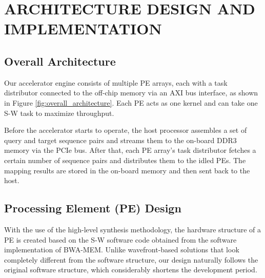 \section{ARCHITECTURE DESIGN AND IMPLEMENTATION} 
\label{sec:architecture}
\subsection{Overall Architecture}

Our accelerator engine consists of multiple PE arrays, each with a task distributor connected to the off-chip memory via an AXI bus interface, as shown in Figure \ref{fig:overall_architecture}.
Each PE acts as one kernel and can take one S-W task to maximize throughput.

Before the accelerator starts to operate, the host processor assembles a set of query and target sequence pairs and streams them to the on-board DDR3 memory via the PCIe bus. 
After that, each PE array's task distributor fetches a certain number of sequence pairs and distributes them to the idled PEs. 
The mapping results are stored in the on-board memory and then sent back to the host.
\subsection{Processing Element (PE) Design}
With the use of the high-level synthesis methodology, the hardware structure of a PE is created based on the S-W software code obtained from the software implementation of BWA-MEM.
Unlike wavefront-based solutions that look completely different from the software structure,  
our design naturally follows the original software structure, which considerably shortens the development period. 

